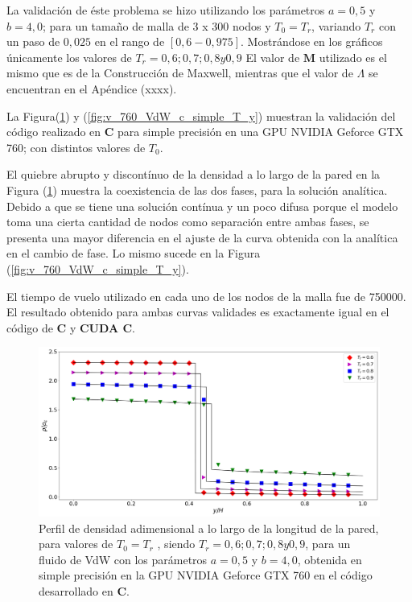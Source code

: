La validación de éste problema se hizo utilizando los parámetros $a =0,5$ y $b = 4,0$; para un tamaño de malla de 3 x 300 nodos y $T_0 = T_r$, variando $T_r$ con un paso de $0,025$ en el rango de $[0,6 - 0,975]$. Mostrándose en los gráficos únicamente los valores de $T_r = 0,6 ; 0,7 ; 0,8 y 0,9$   El valor de $\mathbf{M}$ utilizado es el mismo que es de la Construcción de Maxwell, mientras que el valor de $\Lambda$ se encuentran en el Apéndice (xxxx).

La Figura(\ref{fig:v_760_VdW_c_simple_rho_y}) y (\ref{fig:v_760_VdW_c_simple_T_y})  muestran la validación del código realizado en \textbf{C} para simple precisión en una GPU NVIDIA Geforce GTX 760; con distintos valores de $T_0$. 

El quiebre abrupto y discontínuo de la densidad a lo largo de la pared en la Figura (\ref{fig:v_760_VdW_c_simple_rho_y}) muestra la coexistencia de las dos fases, para la solución analítica. Debido a que se tiene una solución contínua y un poco difusa porque el modelo toma una cierta cantidad de nodos como separación entre ambas fases, se presenta una mayor diferencia en el ajuste de la curva obtenida con la analítica en el cambio de fase. Lo mismo sucede en la Figura (\ref{fig:v_760_VdW_c_simple_T_y}).

El tiempo de vuelo utilizado en cada uno de los nodos de la malla fue de 750000. 
El resultado obtenido para ambas curvas validades es exactamente igual en el código de \textbf{C} y \textbf{CUDA C}.

\begin{figure}[h!]
	\centering
	\includegraphics[width=\textwidth]{figs/cap4/v_760_VdW_c_simple_rho_y}
	\caption{Perfil de densidad adimensional a lo largo de la longitud de la pared, para valores de $T_0 = T_r$ , siendo $T_r = 0,6 ; 0,7 ; 0,8 y 0,9$, para un fluido de VdW con los parámetros $a = 0,5 $ y $b = 4,0 $, obtenida en simple precisión en la GPU NVIDIA Geforce GTX 760 en el código desarrollado en \textbf{C}.}
	\label{fig:v_760_VdW_c_simple_rho_y}	
\end{figure}


